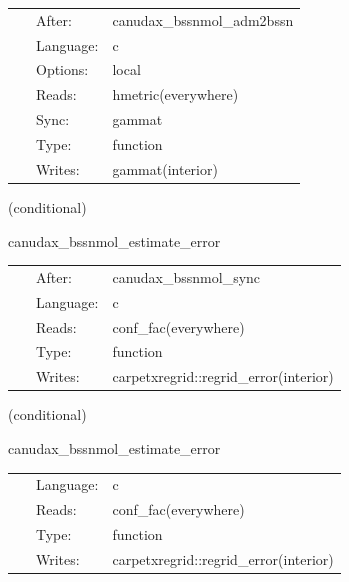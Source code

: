 \hspace{5mm}{\it set gammat initial data } 


\hspace{5mm}

 \begin{tabular*}{160mm}{cll} 
~ & After:  & canudax\_bssnmol\_adm2bssn \\ 
~ & Language:  & c \\ 
~ & Options:  & local \\ 
~ & Reads:  & hmetric(everywhere) \\ 
~ & Sync:  & gammat \\ 
~ & Type:  & function \\ 
~ & Writes:  & gammat(interior) \\ 
\end{tabular*} 


\vspace{5mm}

   (conditional) 

\hspace{5mm} canudax\_bssnmol\_estimate\_error 

\hspace{5mm}{\it estimate error for regridding } 


\hspace{5mm}

 \begin{tabular*}{160mm}{cll} 
~ & After:  & canudax\_bssnmol\_sync \\ 
~ & Language:  & c \\ 
~ & Reads:  & conf\_fac(everywhere) \\ 
~ & Type:  & function \\ 
~ & Writes:  & carpetxregrid::regrid\_error(interior) \\ 
\end{tabular*} 


\vspace{5mm}

   (conditional) 

\hspace{5mm} canudax\_bssnmol\_estimate\_error 

\hspace{5mm}{\it estimate error for regridding } 


\hspace{5mm}

 \begin{tabular*}{160mm}{cll} 
~ & Language:  & c \\ 
~ & Reads:  & conf\_fac(everywhere) \\ 
~ & Type:  & function \\ 
~ & Writes:  & carpetxregrid::regrid\_error(interior) \\ 
\end{tabular*} 


